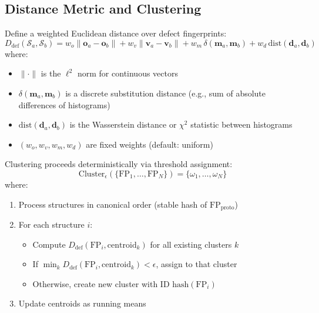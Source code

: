\documentclass[11pt]{article}
\begin{document}
\subsection{Distance Metric and Clustering}

Define a weighted Euclidean distance over defect fingerprints:
\begin{equation}
\label{eq:defect-dist}
D_{\mathrm{def}}(\mathcal{S}_a, \mathcal{S}_b) =
w_o \|\mathbf{o}_a - \mathbf{o}_b\| +
w_v \|\mathbf{v}_a - \mathbf{v}_b\| +
w_m \,\delta(\mathbf{m}_a, \mathbf{m}_b) +
w_d \,\mathrm{dist}(\mathbf{d}_a, \mathbf{d}_b)
\end{equation}
where:
\begin{itemize}
  \item $\|\cdot\|$ is the $\ell^2$ norm for continuous vectors
  \item $\delta(\mathbf{m}_a, \mathbf{m}_b)$ is a discrete substitution distance
        (e.g., sum of absolute differences of histograms)
  \item $\mathrm{dist}(\mathbf{d}_a, \mathbf{d}_b)$ is the Wasserstein distance
        or $\chi^2$ statistic between histograms
  \item $(w_o, w_v, w_m, w_d)$ are fixed weights (default: uniform)
\end{itemize}

Clustering proceeds deterministically via threshold assignment:
\begin{equation}
\mathrm{Cluster}_{\epsilon}(\{\mathrm{FP}_1, \ldots, \mathrm{FP}_N\}) =
\{\omega_1, \ldots, \omega_N\}
\end{equation}
where:
\begin{enumerate}
  \item Process structures in canonical order (stable hash of $\mathrm{FP}_{\mathrm{proto}}$)
  \item For each structure $i$:
    \begin{itemize}
      \item Compute $D_{\mathrm{def}}(\mathrm{FP}_i, \mathrm{centroid}_k)$ for
            all existing clusters $k$
      \item If $\min_k D_{\mathrm{def}}(\mathrm{FP}_i, \mathrm{centroid}_k) < \epsilon$,
            assign to that cluster
      \item Otherwise, create new cluster with ID $\mathrm{hash}(\mathrm{FP}_i)$
    \end{itemize}
  \item Update centroids as running means
\end{enumerate}
\end{document}
